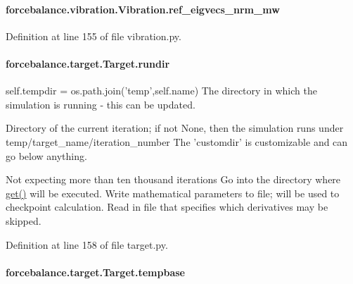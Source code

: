 \hypertarget{classforcebalance_1_1vibration_1_1Vibration_a6b2b9f1e95bea0edabd46ada819cd005}{
\paragraph[{ref\-\_\-eigvecs\-\_\-nrm\-\_\-mw}]{\setlength{\rightskip}{0pt plus 5cm}forcebalance.\-vibration.\-Vibration.\-ref\-\_\-eigvecs\-\_\-nrm\-\_\-mw}}\label{classforcebalance_1_1vibration_1_1Vibration_a6b2b9f1e95bea0edabd46ada819cd005}


Definition at line 155 of file vibration.\-py.

\hypertarget{classforcebalance_1_1target_1_1Target_a6872de5b2d4273b82336ea5b0da29c9e}{
\paragraph[{rundir}]{\setlength{\rightskip}{0pt plus 5cm}forcebalance.\-target.\-Target.\-rundir\hspace{0.3cm}{\ttfamily [inherited]}}}\label{classforcebalance_1_1target_1_1Target_a6872de5b2d4273b82336ea5b0da29c9e}


self.\-tempdir = os.\-path.\-join('temp',self.\-name) The directory in which the simulation is running -\/ this can be updated. 

Directory of the current iteration; if not None, then the simulation runs under temp/target\-\_\-name/iteration\-\_\-number The 'customdir' is customizable and can go below anything.

Not expecting more than ten thousand iterations Go into the directory where \hyperlink{classforcebalance_1_1target_1_1Target_a1389888302c49d529716cb45b13a6f5a}{get()} will be executed. Write mathematical parameters to file; will be used to checkpoint calculation. Read in file that specifies which derivatives may be skipped. 

Definition at line 158 of file target.\-py.

\hypertarget{classforcebalance_1_1target_1_1Target_ae5b544d3e11365865813ef3d626ef81d}{
\paragraph[{tempbase}]{\setlength{\rightskip}{0pt plus 5cm}forcebalance.\-target.\-Target.\-tempbase\hspace{0.3cm}{\ttfamily [inherited]}}}\label{classforcebalance_1_1target_1_1Target_ae5b544d3e11365865813ef3d626ef81d}


